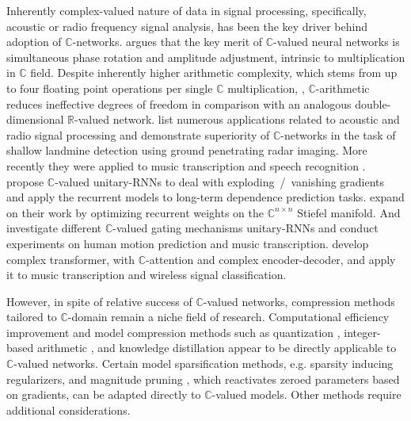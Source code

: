 \documentclass[a4paper,10pt]{article}
\newcommand{\real}{\mathbb{R}}
\newcommand{\cplx}{\mathbb{C}}
\begin{document}
Inherently complex-valued nature of data in signal processing, specifically, acoustic or radio
frequency signal analysis, has been the key driver behind adoption of $\cplx$-networks.
%
\citet{hirose_complex-valued_2009} argues that the key merit of $\cplx$-valued neural
networks is simultaneous phase rotation and amplitude adjustment, intrinsic to multiplication
in $\cplx$ field. Despite inherently higher arithmetic complexity, which stems from up to four
floating point operations per single $\cplx$ multiplication, \citep{monning_evaluation_2018},
$\cplx$-arithmetic reduces ineffective degrees of freedom in comparison with an analogous
double-dimensional $\real$-valued network. \citet{hirose_complex-valued_2009} list numerous
applications related to acoustic and radio signal processing and demonstrate superiority of
$\cplx$-networks in the task of shallow landmine detection using ground penetrating radar
imaging. More recently they were applied to music transcription and speech recognition
\citep{trabelsi_deep_2017}. \citet{arjovsky_unitary_2016} propose $\cplx$-valued unitary-RNNs
to deal with exploding~/~vanishing gradients and apply the recurrent models to long-term
dependence prediction tasks. \citet{wisdom_full-capacity_2016} expand on their work by optimizing
recurrent weights on the $\cplx^{n \times n}$ Stiefel manifold. And \citet{wolter_complex_2018}
investigate different $\cplx$-valued gating mechanisms unitary-RNNs and conduct experiments
on human motion prediction and music transcription. \citet{yang_complex_2019} develop complex
transformer, with $\cplx$-attention and complex encoder-decoder, and apply it to music
transcription and wireless signal classification.


However, in spite of relative success of $\cplx$-valued networks, compression methods tailored
to $\cplx$-domain remain a niche field of research.
%
Computational efficiency improvement and model compression methods such as quantization
\citep{uhlich_differentiable_2019}, integer-based arithmetic \citep{lin_fixed_2016,chen_fxpnet_2017},
and knowledge distillation \citep{hinton_distilling_2015} appear to be directly applicable
to $\cplx$-valued networks.
%
Certain model sparsification methods, e.g. sparsity inducing regularizers, and magnitude
pruning \citep{zuo_compression_2019}, which reactivates zeroed parameters based on gradients,
can be adapted directly to $\cplx$-valued models. Other methods require additional considerations.
\end{document}
